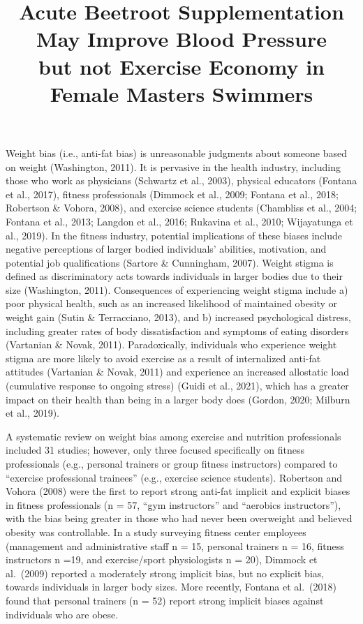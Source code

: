 \documentclass[
  jou,
  longtable,
  colorlinks=true,linkcolor=blue,citecolor=blue,urlcolor=blue]{apa7}
\title{\vskip 1.5cm
\bfseries Acute Beetroot Supplementation May Improve Blood Pressure \\ but not Exercise Economy in Female Masters Swimmers}
\begin{document}
\maketitle
\setcounter{secnumdepth}{-\maxdimen} %

\setlength\LTleft{0pt}


Weight bias (i.e., anti-fat bias) is unreasonable judgments about
someone based on weight (Washington, 2011). It is pervasive in the
health industry, including those who work as physicians (Schwartz et
al., 2003), physical educators (Fontana et al., 2017), fitness
professionals (Dimmock et al., 2009; Fontana et al., 2018; Robertson \&
Vohora, 2008), and exercise science students (Chambliss et al., 2004;
Fontana et al., 2013; Langdon et al., 2016; Rukavina et al., 2010;
Wijayatunga et al., 2019). In the fitness industry, potential
implications of these biases include negative perceptions of larger
bodied individuals' abilities, motivation, and potential job
qualifications (Sartore \& Cunningham, 2007). Weight stigma is defined
as discriminatory acts towards individuals in larger bodies due to their
size (Washington, 2011). Consequences of experiencing weight stigma
include a) poor physical health, such as an increased likelihood of
maintained obesity or weight gain (Sutin \& Terracciano, 2013), and b)
increased psychological distress, including greater rates of body
dissatisfaction and symptoms of eating disorders (Vartanian \& Novak,
2011). Paradoxically, individuals who experience weight stigma are more
likely to avoid exercise as a result of internalized anti-fat attitudes
(Vartanian \& Novak, 2011) and experience an increased allostatic load
(cumulative response to ongoing stress) (Guidi et al., 2021), which has
a greater impact on their health than being in a larger body does
(Gordon, 2020; Milburn et al., 2019).

A systematic review on weight bias among exercise and nutrition
professionals included 31 studies; however, only three focused
specifically on fitness professionals (e.g., personal trainers or group
fitness instructors) compared to ``exercise professional trainees''
(e.g., exercise science students). Robertson and Vohora (2008) were the
first to report strong anti-fat implicit and explicit biases in fitness
professionals (n = 57, ``gym instructors'' and ``aerobics
instructors''), with the bias being greater in those who had never been
overweight and believed obesity was controllable. In a study surveying
fitness center employees (management and administrative staff n = 15,
personal trainers n = 16, fitness instructors n =19, and exercise/sport
physiologists n = 20), Dimmock et al.~(2009) reported a moderately
strong implicit bias, but no explicit bias, towards individuals in
larger body sizes. More recently, Fontana et al.~(2018) found that
personal trainers (n = 52) report strong implicit biases against
individuals who are obese.
\end{document}
